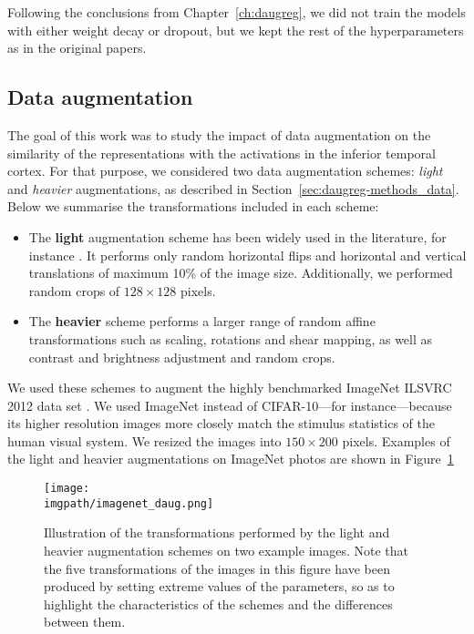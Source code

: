 {Following the conclusions from Chapter~\ref{ch:daugreg}, we did not train the models with either weight decay or dropout, but we kept the rest of the hyperparameters as in the original papers.

\subsection{Data augmentation}
The goal of this work was to study the impact of data augmentation on the similarity of the representations with the activations in the inferior temporal cortex. For that purpose, we considered two data augmentation schemes: \textit{light} and \textit{heavier} augmentations, as described in Section~\ref{sec:daugreg-methods_data}. Below we summarise the transformations included in each scheme:

\begin{itemize}
    \item The \textbf{light} augmentation scheme has been widely used in the literature, for instance \citep{springenberg2014allcnn}. It performs only random horizontal flips and horizontal and vertical translations of maximum 10\% of the image size. Additionally, we performed random crops of $128\times128$ pixels.
    \item The \textbf{heavier} scheme performs a larger range of random affine transformations such as scaling, rotations and shear mapping, as well as contrast and brightness adjustment and random crops.
\end{itemize}
 
We used these schemes to augment the highly benchmarked ImageNet ILSVRC 2012 data set \citep{russakovsky2015imagenet}. We used ImageNet instead of CIFAR-10---for instance---because its higher resolution images more closely match the stimulus statistics of the human visual system. We resized the images into $150\times200$ pixels. Examples of the light and heavier augmentations on ImageNet photos are shown in Figure~\ref{fig:daugit-daugimagenet}

\begin{figure}[ht]
  \begin{center}
    \texttt{[image: \\imgpath/imagenet\_daug.png]}
  \end{center}
  \caption{Illustration of the transformations performed by the light and heavier augmentation schemes on two example images. Note that the five transformations of the images in this figure have been produced by setting extreme values of the parameters, so as to highlight the characteristics of the schemes and the differences between them.}
  \label{fig:daugit-daugimagenet}
\end{figure}

}
